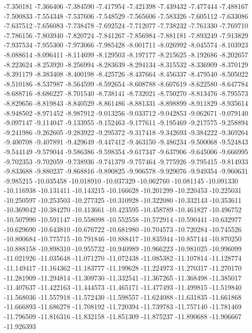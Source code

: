 -7.350181
-7.366406
-7.384590
-7.417954
-7.421398
-7.439432
-7.477444
-7.488167
-7.500833
-7.554348
-7.537606
-7.548529
-7.565606
-7.583326
-7.605112
-7.633086
-7.637512
-7.656083
-7.738478
-7.692524
-7.712077
-7.738232
-7.761330
-7.769710
-7.786156
-7.803940
-7.820724
-7.841267
-7.856984
-7.881181
-7.893249
-7.913829
-7.937534
-7.955300
-7.973066
-7.985428
-8.001711
-8.026992
-8.045574
-8.103923
-8.088614
-8.096411
-8.114699
-8.129503
-8.197177
-8.215625
-8.192686
-8.202657
-8.223624
-8.253920
-8.256994
-8.283639
-8.294134
-8.315532
-8.336909
-8.370129
-8.391179
-8.383408
-8.400198
-8.425726
-8.437664
-8.456337
-8.479540
-8.505022
-8.510186
-8.537987
-8.564599
-8.592654
-8.608788
-8.607619
-8.622580
-8.647784
-8.688716
-8.686227
-8.701540
-8.738141
-8.732021
-8.750270
-8.813476
-8.795573
-8.829656
-8.819843
-8.840529
-8.861486
-8.881331
-8.898899
-8.911829
-8.935614
-8.948502
-8.971452
-8.987912
-9.013256
-9.033712
-9.042853
-9.062671
-9.079140
-9.097147
-9.114047
-9.133955
-9.152463
-9.177611
-9.195469
-9.217575
-9.258894
-9.241986
-9.262605
-9.283922
-9.295372
-9.317418
-9.342693
-9.384222
-9.369264
-9.400708
-9.407891
-9.429649
-9.447412
-9.463150
-9.486234
-9.500068
-9.524843
-9.544149
-9.579044
-9.586386
-9.598354
-9.617347
-9.637906
-9.645006
-9.666995
-9.702353
-9.702059
-9.738936
-9.741379
-9.757464
-9.775926
-9.795415
-9.814933
-9.833688
-9.880237
-9.868816
-9.890825
-9.906578
-9.929076
-9.949354
-9.960631
-9.985215
-10.035458
-10.018910
-10.037329
-10.062760
-10.081145
-10.091330
-10.116938
-10.131411
-10.143215
-10.166628
-10.201299
-10.220453
-10.225031
-10.250597
-10.253503
-10.277325
-10.310928
-10.322080
-10.332143
-10.353611
-10.369042
-10.384270
-10.413661
-10.423595
-10.458789
-10.461827
-10.496752
-10.507990
-10.591147
-10.558098
-10.552558
-10.572914
-10.590441
-10.632977
-10.629690
-10.643810
-10.676722
-10.681980
-10.704573
-10.720284
-10.745526
-10.800684
-10.775715
-10.791846
-10.888417
-10.835944
-10.857144
-10.870250
-10.888158
-10.898310
-10.955732
-10.940989
-10.966223
-10.981025
-10.996099
-11.021926
-11.035648
-11.071270
-11.072438
-11.085382
-11.107814
-11.128774
-11.149417
-11.164362
-11.183777
-11.199628
-11.224973
-11.270317
-11.270170
-11.281909
-11.294814
-11.309730
-11.332541
-11.367265
-11.368498
-11.385017
-11.407637
-11.422163
-11.444573
-11.465171
-11.477493
-11.499815
-11.519840
-11.568036
-11.557918
-11.572430
-11.598557
-11.624088
-11.631835
-11.661868
-11.666893
-11.686278
-11.708192
-11.720394
-11.739783
-11.757140
-11.781469
-11.796509
-11.816316
-11.832158
-11.851309
-11.875237
-11.890688
-11.906667
-11.926393
